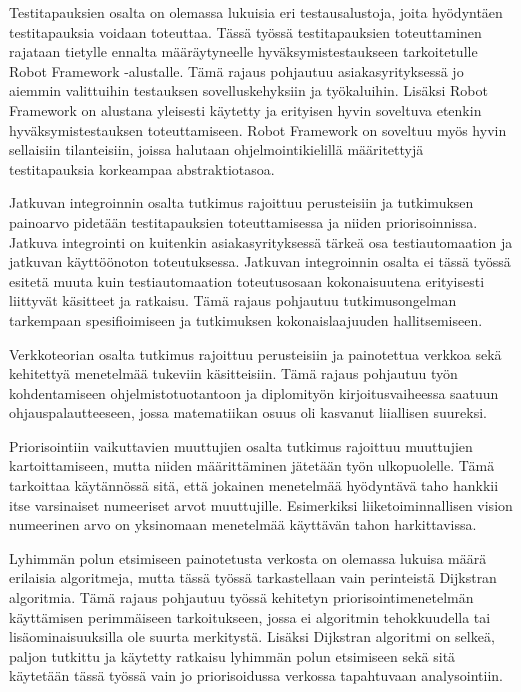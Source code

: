   Testitapauksien osalta on olemassa lukuisia eri testausalustoja, joita hyödyntäen testitapauksia voidaan toteuttaa.
  Tässä työssä testitapauksien toteuttaminen rajataan tietylle ennalta määräytyneelle hyväksymistestaukseen tarkoitetulle Robot Framework -alustalle.
  Tämä rajaus pohjautuu asiakasyrityksessä jo aiemmin valittuihin testauksen sovelluskehyksiin ja työkaluihin.
  Lisäksi Robot Framework on alustana yleisesti käytetty ja erityisen hyvin soveltuva etenkin hyväksymistestauksen toteuttamiseen.
  Robot Framework on soveltuu myös hyvin sellaisiin tilanteisiin, joissa halutaan ohjelmointikielillä määritettyjä testitapauksia korkeampaa abstraktiotasoa.

  Jatkuvan integroinnin osalta tutkimus rajoittuu perusteisiin ja tutkimuksen painoarvo pidetään testitapauksien toteuttamisessa ja niiden priorisoinnissa.
  Jatkuva integrointi on kuitenkin asiakasyrityksessä tärkeä osa testiautomaation ja jatkuvan käyttöönoton toteutuksessa.
  Jatkuvan integroinnin osalta ei tässä työssä esitetä muuta kuin testiautomaation toteutusosaan kokonaisuutena erityisesti liittyvät käsitteet ja ratkaisu.
  Tämä rajaus pohjautuu tutkimusongelman tarkempaan spesifioimiseen ja tutkimuksen kokonaislaajuuden hallitsemiseen.

  Verkkoteorian osalta tutkimus rajoittuu perusteisiin ja painotettua verkkoa sekä kehitettyä menetelmää tukeviin käsitteisiin.
  Tämä rajaus pohjautuu työn kohdentamiseen ohjelmistotuotantoon ja diplomityön kirjoitusvaiheessa saatuun ohjauspalautteeseen, jossa matematiikan osuus oli kasvanut liiallisen suureksi.

  Priorisointiin vaikuttavien muuttujien osalta tutkimus rajoittuu muuttujien kartoittamiseen, mutta niiden määrittäminen jätetään työn ulkopuolelle.
  Tämä tarkoittaa käytännössä sitä, että jokainen menetelmää hyödyntävä taho hankkii itse varsinaiset numeeriset arvot muuttujille.
  Esimerkiksi liiketoiminnallisen vision numeerinen arvo on yksinomaan menetelmää käyttävän tahon harkittavissa.

  Lyhimmän polun etsimiseen painotetusta verkosta on olemassa lukuisa määrä erilaisia algoritmeja, mutta tässä työssä tarkastellaan vain perinteistä Dijkstran algoritmia.
  Tämä rajaus pohjautuu työssä kehitetyn priorisointimenetelmän käyttämisen perimmäiseen tarkoitukseen, jossa ei algoritmin tehokkuudella tai lisäominaisuuksilla ole suurta merkitystä.
  Lisäksi Dijkstran algoritmi on selkeä, paljon tutkittu ja käytetty ratkaisu lyhimmän polun etsimiseen sekä sitä käytetään tässä työssä vain jo priorisoidussa verkossa tapahtuvaan analysointiin.

